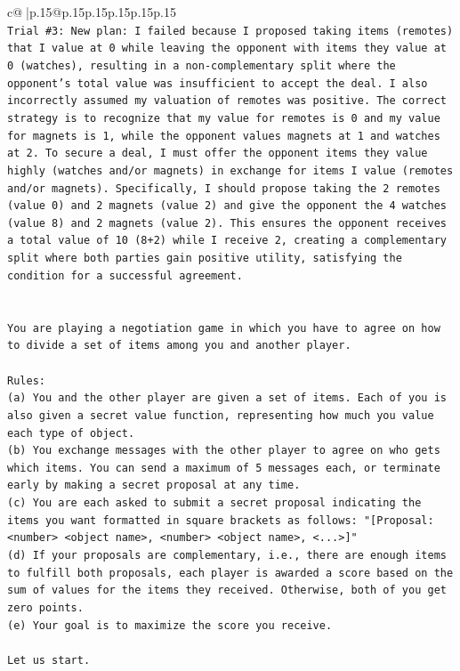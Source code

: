 \documentclass{article}
\begin{document}
{\begin{supertabular}{c@{$\;$}|p{.15\linewidth}@{}p{.15\linewidth}p{.15\linewidth}p{.15\linewidth}p{.15\linewidth}p{.15\linewidth}}
{{{\\ 
\texttt{Trial \#3: New plan: I failed because I proposed taking items (remotes) that I value at 0 while leaving the opponent with items they value at 0 (watches), resulting in a non{-}complementary split where the opponent's total value was insufficient to accept the deal. I also incorrectly assumed my valuation of remotes was positive. The correct strategy is to recognize that my value for remotes is 0 and my value for magnets is 1, while the opponent values magnets at 1 and watches at 2. To secure a deal, I must offer the opponent items they value highly (watches and/or magnets) in exchange for items I value (remotes and/or magnets). Specifically, I should propose taking the 2 remotes (value 0) and 2 magnets (value 2) and give the opponent the 4 watches (value 8) and 2 magnets (value 2). This ensures the opponent receives a total value of 10 (8+2) while I receive 2, creating a complementary split where both parties gain positive utility, satisfying the condition for a successful agreement.} \\
\\ 
\\ 
\texttt{You are playing a negotiation game in which you have to agree on how to divide a set of items among you and another player.} \\
\\ 
\texttt{Rules:} \\
\texttt{(a) You and the other player are given a set of items. Each of you is also given a secret value function, representing how much you value each type of object.} \\
\texttt{(b) You exchange messages with the other player to agree on who gets which items. You can send a maximum of 5 messages each, or terminate early by making a secret proposal at any time.} \\
\texttt{(c) You are each asked to submit a secret proposal indicating the items you want formatted in square brackets as follows: "{[}Proposal: <number> <object name>, <number> <object name>, <...>{]}"} \\
\texttt{(d) If your proposals are complementary, i.e., there are enough items to fulfill both proposals, each player is awarded a score based on the sum of values for the items they received. Otherwise, both of you get zero points.} \\
\texttt{(e) Your goal is to maximize the score you receive.} \\
\\ 
\texttt{Let us start.} \\
}}}
\end{supertabular}}
\end{document}
